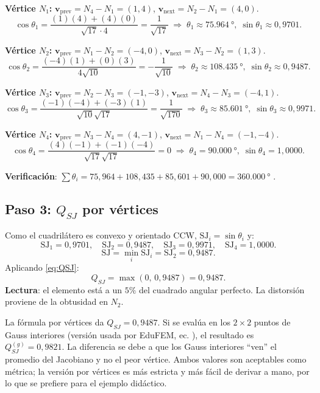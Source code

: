 \documentclass[11pt,a4paper]{article}
\begin{document}
\noindent\textbf{V\'ertice $N_1$:} $\bm{v}_{\text{prev}}=N_4-N_1=(1,4)$,
$\bm{v}_{\text{next}}=N_2-N_1=(4,0)$.
\[
  \cos\theta_1 = \frac{(1)(4)+(4)(0)}{\sqrt{17}\cdot 4} = \frac{1}{\sqrt{17}}
  \;\Rightarrow\; \theta_1 \approx \SI{75,964}{\degree},\; \sin\theta_1 \approx 0{,}9701.
\]

\noindent\textbf{V\'ertice $N_2$:} $\bm{v}_{\text{prev}}=N_1-N_2=(-4,0)$,
$\bm{v}_{\text{next}}=N_3-N_2=(1,3)$.
\[
  \cos\theta_2 = \frac{(-4)(1)+(0)(3)}{4\sqrt{10}} = -\frac{1}{\sqrt{10}}
  \;\Rightarrow\; \theta_2 \approx \SI{108,435}{\degree},\; \sin\theta_2 \approx 0{,}9487.
\]

\noindent\textbf{V\'ertice $N_3$:} $\bm{v}_{\text{prev}}=N_2-N_3=(-1,-3)$,
$\bm{v}_{\text{next}}=N_4-N_3=(-4,1)$.
\[
  \cos\theta_3 = \frac{(-1)(-4)+(-3)(1)}{\sqrt{10}\sqrt{17}} = \frac{1}{\sqrt{170}}
  \;\Rightarrow\; \theta_3 \approx \SI{85,601}{\degree},\; \sin\theta_3 \approx 0{,}9971.
\]

\noindent\textbf{V\'ertice $N_4$:} $\bm{v}_{\text{prev}}=N_3-N_4=(4,-1)$,
$\bm{v}_{\text{next}}=N_1-N_4=(-1,-4)$.
\[
  \cos\theta_4 = \frac{(4)(-1)+(-1)(-4)}{\sqrt{17}\sqrt{17}} = 0
  \;\Rightarrow\; \theta_4 = \SI{90,000}{\degree},\; \sin\theta_4 = 1{,}0000.
\]

\noindent\textbf{Verificaci\'on}: $\sum\theta_i = 75{,}964 + 108{,}435 + 85{,}601 + 90{,}000 = \SI{360,000}{\degree}$ \checkmark.

\subsection{Paso 3: $Q_{SJ}$ por v\'ertices}

Como el cuadril\'atero es convexo y orientado CCW, $\mathrm{SJ}_i = \sin\theta_i$ y:
\[
  \mathrm{SJ}_1 = 0{,}9701, \quad
  \mathrm{SJ}_2 = 0{,}9487, \quad
  \mathrm{SJ}_3 = 0{,}9971, \quad
  \mathrm{SJ}_4 = 1{,}0000.
\]
\[
  \mathrm{SJ} = \min_i \mathrm{SJ}_i = \mathrm{SJ}_2 = 0{,}9487.
\]
Aplicando \eqref{eq:QSJ}:
\[
  \boxed{\;Q_{SJ} = \max(0,\,0{,}9487) = 0{,}9487.\;}
\]
\textbf{Lectura}: el elemento est\'a a un $5\%$ del cuadrado angular perfecto. La distorsi\'on
proviene de la obtusidad en $N_2$.

\medskip

\begin{notabox}[title=Nota: $Q_{SJ}$ por v\'ertices vs por Gauss]
La f\'ormula por v\'ertices da $Q_{SJ}=0{,}9487$. Si se eval\'ua en los $2\times 2$ puntos de
Gauss interiores (versi\'on usada por EduFEM, ec. \cite{Knupp2000b}), el resultado es
$Q_{SJ}^{(g)} = 0{,}9821$. La diferencia se debe a que los Gauss interiores ``ven'' el promedio
del Jacobiano y no el peor v\'ertice. Ambos valores son aceptables como m\'etrica; la versi\'on
por v\'ertices es m\'as estricta y m\'as f\'acil de derivar a mano, por lo que se prefiere para
el ejemplo did\'actico.
\end{notabox}
\end{document}
